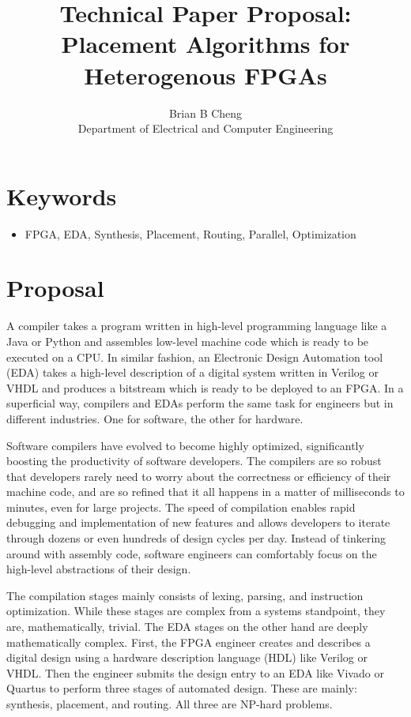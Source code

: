 \documentclass{article}
\begin{document}
\title{Technical Paper Proposal: \\ Placement Algorithms for Heterogenous FPGAs}
\author{Brian B Cheng \\ Department of Electrical and Computer Engineering}


\date{}
\maketitle

\section{Keywords}
\begin{itemize}
    \item FPGA, EDA, Synthesis, Placement, Routing, Parallel, Optimization
\end{itemize}


\section{Proposal}
    A compiler takes a program written in high-level programming language like a Java or Python and assembles low-level machine code which is ready to be executed on a CPU.
    In similar fashion, an Electronic Design Automation tool (EDA) takes a high-level description of a digital system written in Verilog or VHDL and produces a bitstream which is ready to be deployed to an FPGA.
    In a superficial way, compilers and EDAs perform the same task for engineers but in different industries. 
    One for software, the other for hardware.

    Software compilers have evolved to become highly optimized, significantly boosting the productivity of software developers. 
    The compilers are so robust that developers rarely need to worry about the correctness or efficiency of their machine code, and are so refined that it all happens in a matter of milliseconds to minutes, even for large projects. %
    The speed of compilation enables rapid debugging and implementation of new features and allows developers to iterate through dozens or even hundreds of design cycles per day.
    Instead of tinkering around with assembly code, software engineers can comfortably focus on the high-level abstractions of their design. 

    The compilation stages mainly consists of lexing, parsing, and instruction optimization.
    While these stages are complex from a systems standpoint, they are, mathematically, trivial.
    The EDA stages on the other hand are deeply mathematically complex. 
    First, the FPGA engineer creates and describes a digital design using a hardware description language (HDL) like Verilog or VHDL.     
    Then the engineer submits the design entry to an EDA like Vivado or Quartus to perform three stages of automated design. 
    These are mainly: synthesis, placement, and routing. 
    All three are NP-hard problems.
\end{document}
